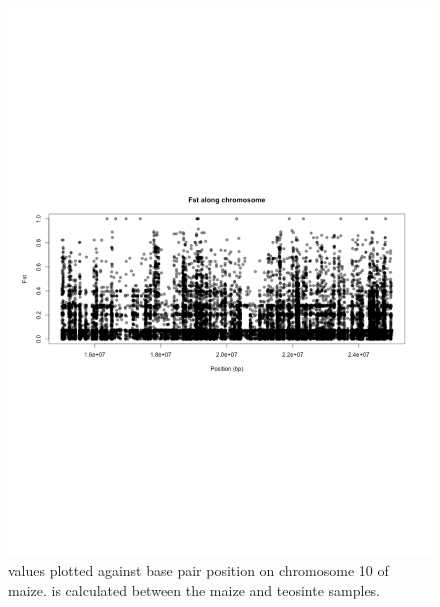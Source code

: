 \begin{figure}
\centering
\includegraphics[width=\linewidth]{figures/supp3.pdf}
\caption{\fst values plotted against base pair position on chromosome 10 of maize. \fst is calculated between the maize and teosinte samples.}
\label{fig:suppfst}
\end{figure}